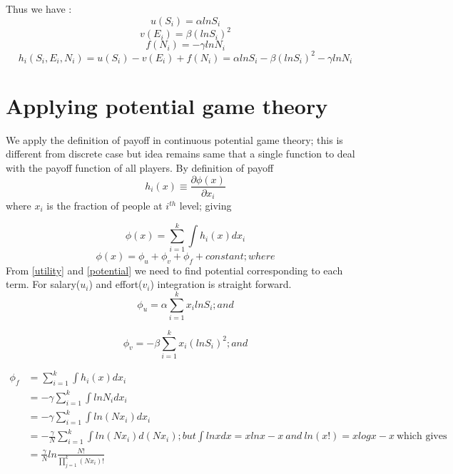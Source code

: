 \documentclass[letterpaper,english,10pt]{article}
\begin{document}
Thus we have :
\begin{equation}
    u(S_i) = \alpha ln S_i
\end{equation}
\begin{equation}
    v(E_i) = \beta (ln S_i)^2
\end{equation}
\begin{equation}
f(N_i) = - \gamma ln N_i
\end{equation}
\begin{equation}\label{utility}
 h_i(S_i,E_i,N_i) = u(S_i) - v(E_i) + f(N_i)= \alpha ln S_i - \beta (ln S_i)^2 - \gamma ln N_i
 \end{equation}
\section{Applying potential game theory}
\begin{defn}
	We apply the definition of payoff in continuous potential game theory; this is different from discrete case but idea remains same that a single function to deal with the payoff function of all players. By definition of payoff
	\begin{equation}
	h_i(x) \equiv  \frac{\partial\phi(x)}{\partial x_i} 
	\end{equation}
	where $x_i$ is the fraction of people at $i^{th}$ level; giving
\end{defn}

\begin{equation} \label{potential}
    \phi(x) = \sum_{i=1}^{k}\int{}{}h_i(x)dx_i
\end{equation}
\begin{equation}
    \phi(x) = \phi_u + \phi_v + \phi_f + constant ; where
\end{equation}
From \ref{utility} and \ref{potential} we need to find potential corresponding to each term. For salary($u_i$) and effort($v_i$) integration is straight forward.
\begin{equation}
    \phi_u = \alpha \sum_{i=1}^{k}x_i lnS_i ;and
\end{equation}

\begin{equation}
    \phi_v = -\beta \sum_{i=1}^{k} x_i(ln S_i)^2 ; and
\end{equation}

\begin{align}
  \phi_f &= \sum_{i=1}^{k}\int{}{}h_i(x)dx_i \\
         &= - \gamma \sum_{i=1}^{k}\int{}{}ln N_i dx_i \\
         &= -\gamma \sum_{i=1}^{k}\int{}{} ln (Nx_i) dx_i \\
         &=-\frac{\gamma}{N} \sum_{i=1}^{k}\int{}{} ln (Nx_i) d(Nx_i); but \int{}{} lnxdx = xlnx -x ~ and ~ln(x!) = xlogx -x ~ \text{which gives}\\
         &=\frac{\gamma}{N} ln\frac{N!}{\prod_{j=1}^{k}(Nx_i)!}   
\end{align}
\end{document}
